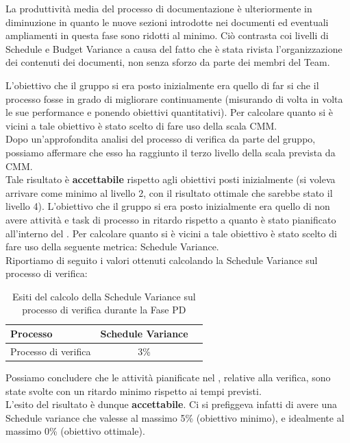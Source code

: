 			La produttività media del processo di documentazione è ulteriormente in diminuzione in quanto le nuove sezioni introdotte nei documenti ed eventuali ampliamenti in questa fase sono ridotti al minimo. Ciò contrasta coi livelli di Schedule e Budget Variance a causa del fatto che è stata rivista l'organizzazione dei contenuti dei documenti, non senza sforzo da parte dei membri del Team.

				L'obiettivo che il gruppo si era posto inizialmente era quello di far si che il processo fosse in grado di migliorare continuamente (misurando di volta in volta le sue performance e ponendo obiettivi quantitativi). Per calcolare quanto si è vicini a tale obiettivo è stato scelto di fare uso della scala CMM.\\
				Dopo un'approfondita analisi del processo di verifica da parte del gruppo, possiamo affermare che esso ha raggiunto il terzo livello della scala prevista da CMM.\\
				Tale risultato è \textbf{accettabile} rispetto agli obiettivi posti inizialmente (si voleva arrivare come minimo al livello 2, con il risultato ottimale che sarebbe stato il livello 4).
				L'obiettivo che il gruppo si era posto inizialmente era quello di non avere attività e task di processo in ritardo rispetto a quanto è stato pianificato all'interno del . Per calcolare quanto si è vicini a tale obiettivo è stato scelto di fare uso della seguente metrica: Schedule Variance.\\
				Riportiamo di seguito i valori ottenuti calcolando la Schedule Variance sul processo di verifica:
				\begin{table}[H]
					\centering
					\begin{tabu}{| l | c | c |}
						\hline
						Processo 			   & Schedule Variance   \\ \hline \hline
						Processo di verifica   & 3\%                 \\ \hline
					\end{tabu}
					\caption{Esiti del calcolo della Schedule Variance sul processo di verifica durante la Fase PD}
				\end{table}
				Possiamo concludere che le attività pianificate nel , relative alla verifica, sono state svolte con un ritardo minimo rispetto ai tempi previsti.\\
				L'esito del risultato è dunque \textbf{accettabile}. Ci si prefiggeva infatti di avere una Schedule variance che valesse al massimo 5\% (obiettivo minimo), e idealmente al massimo 0\% (obiettivo ottimale).	

